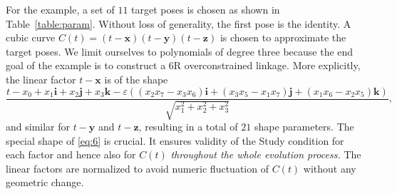\documentclass{scrartcl}
\renewcommand{\vec}[1]{\mathbf{#1}}
\newcommand{\eps}{\varepsilon}
\newcommand{\qi}{\mathbf{i}}
\newcommand{\qj}{\mathbf{j}}
\newcommand{\qk}{\mathbf{k}}
\begin{document}
For the example, a set of $11$ target poses is chosen as shown in
Table~\ref{table:param}. Without loss of generality, the first pose is the
identity. A cubic curve $ C(t) = (t-\vec{x})(t-\vec{y})(t-\vec{z}) $ is chosen
to approximate the target poses. We limit ourselves to polynomials of degree
three because the end goal of the example is to construct a $6$R overconstrained
linkage. More explicitly, the linear factor $t-\vec{x}$ is of the shape
\begin{equation}\label{eq:6}
  \frac{t-x_0+x_1 \qi+x_2 \qj+x_3 \qk-\eps ((x_2 x_7-x_3 x_6) \qi+(x_3 x_5-x_1 x_7) \qj+(x_1 x_6-x_2 x_5) \qk)}{\sqrt{x_1^2+x_2^2+x_3^2}},
\end{equation}
and similar for $t-\vec{y}$ and $t-\vec{z}$, resulting in a total of $21$ shape
parameters. The special shape of \eqref{eq:6} is crucial. It ensures validity of
the Study condition for each factor and hence also for $C(t)$ \emph{throughout
  the whole evolution process.} The linear factors are normalized to avoid
numeric fluctuation of $C(t)$ without any geometric change.
\end{document}
